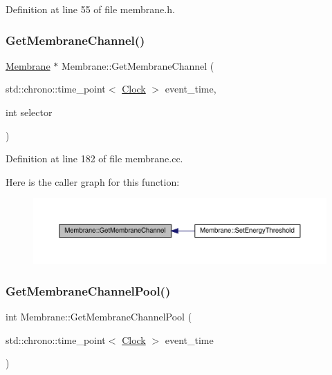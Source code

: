 Definition at line 55 of file membrane.\+h.

\mbox{\label{class_membrane_a1e2bdb800f0f38254214ea7cbdc06941}} 
\subsubsection{\texorpdfstring{Get\+Membrane\+Channel()}{GetMembraneChannel()}}
{\footnotesize\ttfamily \hyperlink{class_membrane}{Membrane} $\ast$ Membrane\+::\+Get\+Membrane\+Channel (\begin{DoxyParamCaption}\item[{std\+::chrono\+::time\+\_\+point$<$ \hyperlink{universe_8h_a0ef8d951d1ca5ab3cfaf7ab4c7a6fd80}{Clock} $>$}]{event\+\_\+time,  }\item[{int}]{selector }\end{DoxyParamCaption})}



Definition at line 182 of file membrane.\+cc.

Here is the caller graph for this function\+:
\nopagebreak
\begin{figure}[H]
\begin{center}
\leavevmode
\includegraphics[width=350pt]{class_membrane_a1e2bdb800f0f38254214ea7cbdc06941_icgraph}
\end{center}
\end{figure}
\mbox{\label{class_membrane_a270278dd346edfe8c7bbd4c48929fdd5}} 
\subsubsection{\texorpdfstring{Get\+Membrane\+Channel\+Pool()}{GetMembraneChannelPool()}}
{\footnotesize\ttfamily int Membrane\+::\+Get\+Membrane\+Channel\+Pool (\begin{DoxyParamCaption}\item[{std\+::chrono\+::time\+\_\+point$<$ \hyperlink{universe_8h_a0ef8d951d1ca5ab3cfaf7ab4c7a6fd80}{Clock} $>$}]{event\+\_\+time }\end{DoxyParamCaption})\hspace{0.3cm}{\ttfamily [inline]}}



